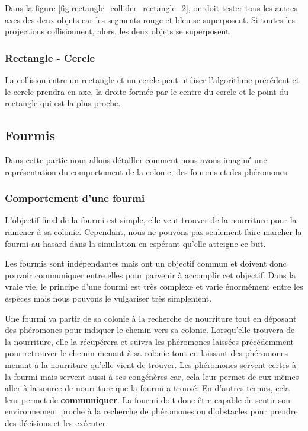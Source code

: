 \documentclass{EPUProjetDi}
\begin{document}
Dans la figure \ref{fig:rectangle_collider_rectangle_2}, on doit tester tous les autres axes des deux objets car les segments rouge et bleu se superposent.
Si toutes les projections collisionnent, alors, les deux objets se superposent.

\subsubsection*{Rectangle - Cercle}
La collision entre un rectangle et un cercle peut utiliser l'algorithme précédent et 
le cercle prendra en axe, la droite formée par le centre du cercle et le point du rectangle qui est la plus proche.

\subsection{Fourmis}

Dans cette partie nous allons détailler comment nous avons imaginé une représentation du comportement de la colonie, des fourmis et des phéromones.

\subsubsection{Comportement d'une fourmi}

L'objectif final de la fourmi est simple, elle veut trouver de la nourriture pour la ramener à sa colonie. Cependant, nous ne pouvons pas seulement
faire marcher la fourmi au hasard dans la simulation en espérant qu'elle atteigne ce but. 

Les fourmis sont indépendantes mais ont un objectif commun et doivent donc pouvoir communiquer entre elles pour parvenir à accomplir cet objectif.
Dans la vraie vie, le principe d'une fourmi est très complexe et varie énormément entre les espèces mais nous pouvons le vulgariser très simplement.

Une fourmi va partir de sa colonie à la recherche de nourriture tout en déposant des phéromones pour indiquer le chemin vers sa colonie. Lorsqu'elle 
trouvera de la nourriture, elle la récupérera et suivra les phéromones laissées précédemment pour retrouver le chemin menant à sa colonie tout en laissant
des phéromones menant à la nourriture qu'elle vient de trouver.  Les phéromones servent certes à la fourmi mais servent aussi à ses congénères car, 
cela leur permet de eux-mêmes aller à la source de nourriture que la fourmi a trouvé. En d'autres termes, cela leur permet de \textbf{communiquer}.
La fourmi doit donc être capable de sentir son environnement proche à la recherche de phéromones ou d'obstacles pour prendre des décisions et les exécuter.
\end{document}
